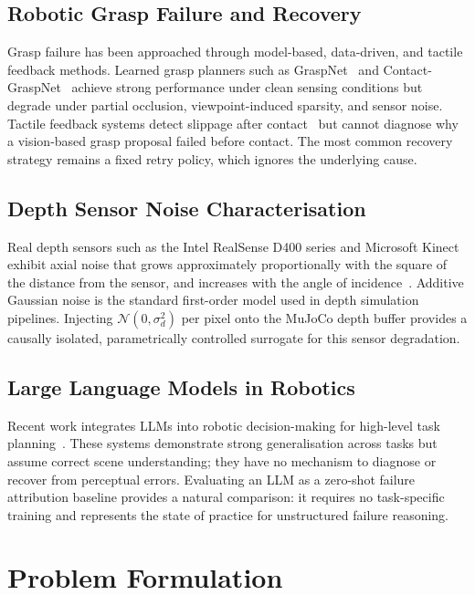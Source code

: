 \documentclass[journal]{IEEEtran}
\begin{document}
\subsection{Robotic Grasp Failure and Recovery}

Grasp failure has been approached through model-based, data-driven,
and tactile feedback methods.  Learned grasp planners such as
GraspNet~\cite{fang2020graspnet} and
Contact-GraspNet~\cite{sundermeyer2021contact} achieve strong
performance under clean sensing conditions but degrade under partial
occlusion, viewpoint-induced sparsity, and sensor noise.  Tactile
feedback systems detect slippage after contact~\cite{calandra2018more}
but cannot diagnose why a vision-based grasp proposal failed before
contact.  The most common recovery strategy remains a fixed retry
policy, which ignores the underlying cause.

\subsection{Depth Sensor Noise Characterisation}

Real depth sensors such as the Intel RealSense D400 series and
Microsoft Kinect exhibit axial noise that grows approximately
proportionally with the square of the distance from the sensor, and
increases with the angle of incidence~\cite{khoshelham2011accuracy}.
Additive Gaussian noise is the standard first-order model used in
depth simulation pipelines.  Injecting $\mathcal{N}(0, \sigma_d^2)$
per pixel onto the MuJoCo depth buffer provides a causally isolated,
parametrically controlled surrogate for this sensor degradation.

\subsection{Large Language Models in Robotics}

Recent work integrates LLMs into robotic decision-making for
high-level task planning~\cite{ahn2022saycan,liang2023code,
huang2023voxposer}.  These systems demonstrate strong generalisation
across tasks but assume correct scene understanding; they have no
mechanism to diagnose or recover from perceptual errors.  Evaluating
an LLM as a zero-shot failure attribution baseline provides a
natural comparison: it requires no task-specific training and
represents the state of practice for unstructured failure reasoning.

\section{Problem Formulation}
\label{sec:formulation}
\end{document}
